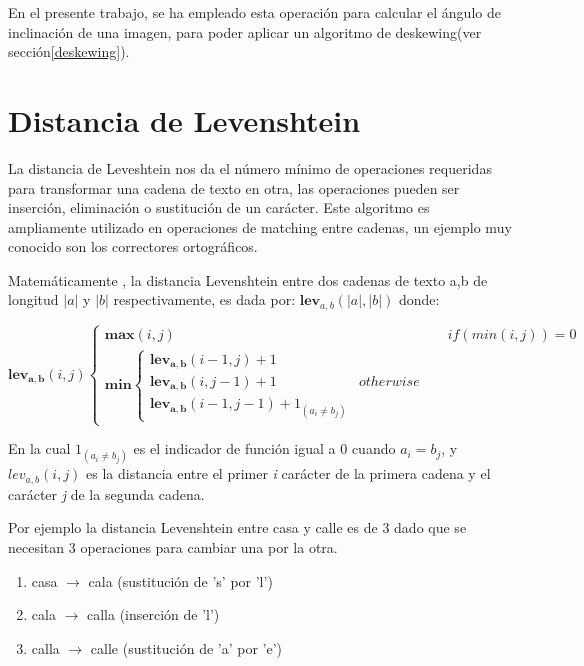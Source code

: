En el presente trabajo, se ha empleado esta operación para calcular el ángulo de inclinación de una imagen, para poder aplicar un algoritmo de deskewing(ver sección\ref{deskewing}).


\section{Distancia de Levenshtein \label{levenshtein}}
La distancia de Leveshtein nos da el número mínimo de operaciones requeridas para transformar una cadena de texto en otra, las operaciones pueden ser inserción, eliminación o sustitución de un carácter\cite{wiki:Levenshtein}.
Este algoritmo es ampliamente utilizado en operaciones de matching entre cadenas, un ejemplo muy conocido son los correctores ortográficos. 

Matemáticamente , la distancia Levenshtein entre dos cadenas de texto a,b de longitud $\left | a \right |$ y $\left | b \right |$ respectivamente, es dada por:
$
\mathbf{lev}_{a,b}\left ( \left | a \right |,\left | b \right | \right )$
donde:

\begin{center}
\begin{equation}
\mathbf{lev_{a,b}}\left ( i,j \right )\left\{\begin{matrix}
\mathbf{max}\left ( i,j \right ) && if(min\left ( i,j \right ))= 0\\ 
\mathbf{min}\left\{\begin{matrix}
\mathbf{lev_{a,b}}\left ( i-1,j \right )+1\\ 
\mathbf{lev_{a,b}}\left ( i,j-1 \right )+1 & otherwise\\
\mathbf{lev_{a,b}}\left ( i-1,j-1 \right )+1  _{\left (a_{i}\neq b_{j} \right )}
\end{matrix}\right.
\end{matrix}\right.
\end{equation}
\end{center}


En la cual $1_{\left (a_{i}\neq b_{j} \right )}$
es el indicador de función igual a 0 cuando 
$a_{i}= b_{j}$, y $lev_{a,b}\left ( i,j \right )$ es la distancia entre el primer \textit{i} carácter de la primera cadena y el carácter \textit{j} de la segunda cadena.

Por ejemplo la distancia Levenshtein entre casa y calle es de 3 dado que se necesitan 3 operaciones  para cambiar una por la otra.
\begin{enumerate}
	\item casa $\rightarrow $ cala (sustitución de 's' por 'l')
	\item cala $\rightarrow $ calla (inserción de 'l')
	\item calla $\rightarrow $ calle (sustitución de 'a' por 'e')
\end{enumerate}

